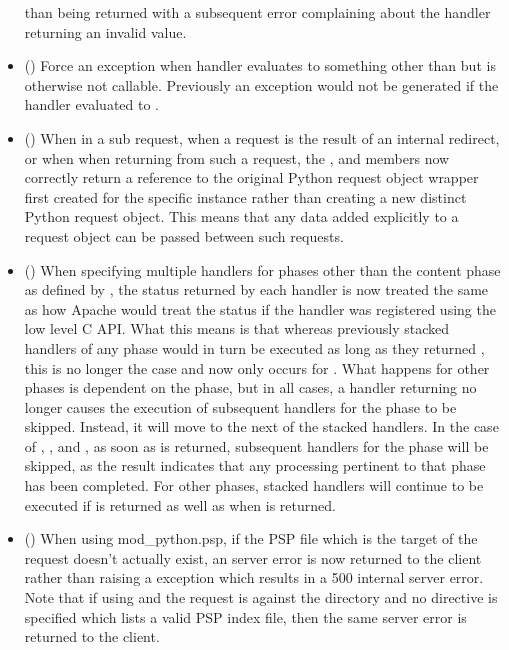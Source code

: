 \begin{itemize}
      than  being returned with a subsequent error complaining
      about the handler returning an invalid value.
    \item
      ()
      Force an exception when handler evaluates to something other than
       but is otherwise not callable. Previously an exception
      would not be generated if the handler evaluated to .
    \item
      ()
      When in a sub request, when a request is the result of an internal
      redirect, or when when returning from such a request, the
      ,  and  members now
      correctly return a reference to the original Python request object
      wrapper first created for the specific  instance
      rather than creating a new distinct Python request object. This means
      that any data added explicitly to a request object can be passed
      between such requests.
    \item
      ()
      When specifying multiple handlers for phases other than the content
      phase as defined by , the status returned by each
      handler is now treated the same as how Apache would treat the status
      if the handler was registered using the low level C API. What this
      means is that whereas previously stacked handlers of any phase would
      in turn be executed as long as they returned , this
      is no longer the case and now only occurs for .
      What happens for other phases is dependent on the phase, but in all
      cases, a handler returning  no longer causes
      the execution of subsequent handlers for the phase to be skipped.
      Instead, it will move to the next of the stacked handlers. In the
      case of , ,
       and , as soon
      as  is returned, subsequent handlers for the phase
      will be skipped, as the result indicates that any processing pertinent
      to that phase has been completed. For other phases, stacked handlers
      will continue to be executed if  is returned as well
      as when  is returned.
    \item
      ()
      When using mod_python.psp, if the PSP file which is the target of the
      request doesn't actually exist, an  server
      error is now returned to the client rather than raising a
       exception which results in a 500 internal server error.
      Note that if using  and the request is against the
      directory and no  directive is specified which
      lists a valid PSP index file, then the same 
      server error is returned to the client.
  \end{itemize}

